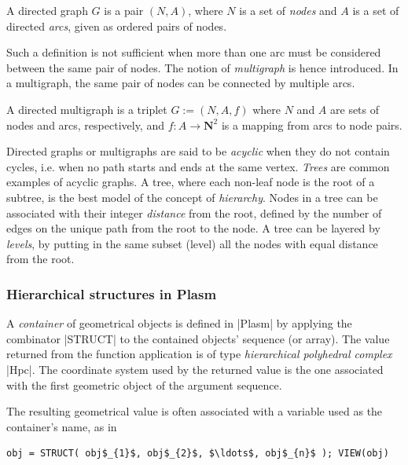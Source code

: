 \begin{coding}
\begin{definition} A directed graph $G$ is a pair $(N,A)$, where
$N$ is a set of \emph{nodes} and $A$ is a set of directed \emph{arcs}, given as ordered pairs of nodes.  
\end{definition}
Such a definition is not sufficient when more than one arc must be considered
between the same pair of nodes.
The notion of \emph{multigraph} is hence introduced.  
In a multigraph, the same pair of nodes can be connected by multiple arcs.

\begin{definition} A directed multigraph is a
triplet $G := (N,A,f)$ where $N$ and $A$ are sets of nodes and arcs, respectively, and $f:
A \to \mathbf{N}^{2}$ is a mapping from arcs to node pairs.  
\end{definition}

Directed graphs or multigraphs are said to be \emph{acyclic} when they do not contain cycles, i.e. when no path starts and ends at the same vertex.  \emph{Trees} are common examples of acyclic graphs. A tree, where each non-leaf node is the root of a subtree, is the best model of the concept of \emph{hierarchy}. Nodes in a tree can be associated with their integer \emph{distance} from the root, defined by the number of edges on the unique path from the root to the node.  A tree can be layered by \emph{levels}, by putting in the same subset (level) all the nodes with equal distance from the root.

\subsubsection*{Hierarchical structures in Plasm}


A \emph{container} of geometrical objects is defined in |Plasm| by
applying the combinator |STRUCT| to the contained objects' sequence (or array).  The value returned from the function application is of type 
\emph{hierarchical polyhedral complex} |Hpc|.  The coordinate system used by
the returned value is the one associated with
the first geometric object of the argument sequence.  

The resulting geometrical value is often associated with a variable used as the container's name, as in
\begin{lstlisting}[language=JuliaLocal, style=julia, mathescape=true]
    obj = STRUCT( obj$_{1}$, obj$_{2}$, $\ldots$, obj$_{n}$ ); VIEW(obj)
\end{lstlisting}


\end{coding}

